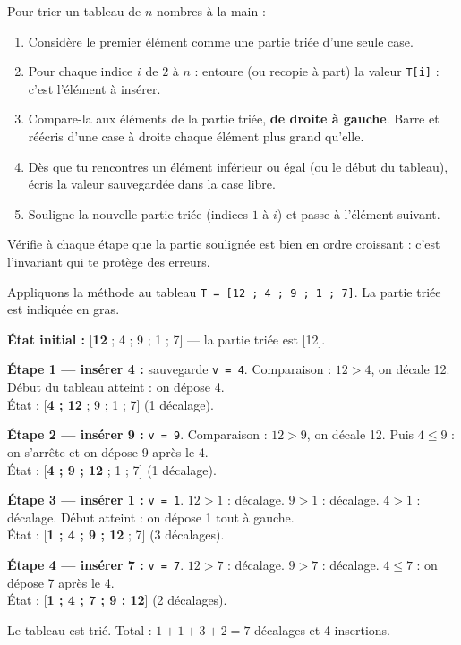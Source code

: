 \documentclass[11pt]{article}
\begin{document}
\begin{methode}
Pour trier un tableau de $n$ nombres à la main :
\begin{enumerate}
\item Considère le premier élément comme une partie triée d'une seule case.
\item Pour chaque indice $i$ de $2$ à $n$ : entoure (ou recopie à part) la valeur \texttt{T[i]} : c'est l'élément à insérer.
\item Compare-la aux éléments de la partie triée, \textbf{de droite à gauche}. Barre et réécris d'une case à droite chaque élément plus grand qu'elle.
\item Dès que tu rencontres un élément inférieur ou égal (ou le début du tableau), écris la valeur sauvegardée dans la case libre.
\item Souligne la nouvelle partie triée (indices $1$ à $i$) et passe à l'élément suivant.
\end{enumerate}
Vérifie à chaque étape que la partie soulignée est bien en ordre croissant : c'est l'invariant qui te protège des erreurs.
\end{methode}

\begin{exemplebox}
Appliquons la méthode au tableau \texttt{T = [12 ; 4 ; 9 ; 1 ; 7]}. La partie triée est indiquée en gras.

\textbf{État initial :} [\textbf{12} ; 4 ; 9 ; 1 ; 7] — la partie triée est [12].

\textbf{Étape 1 — insérer 4 :} sauvegarde \texttt{v = 4}. Comparaison : $12 > 4$, on décale 12. Début du tableau atteint : on dépose 4. \\
État : [\textbf{4 ; 12} ; 9 ; 1 ; 7] (1 décalage).

\textbf{Étape 2 — insérer 9 :} \texttt{v = 9}. Comparaison : $12 > 9$, on décale 12. Puis $4 \leq 9$ : on s'arrête et on dépose 9 après le 4. \\
État : [\textbf{4 ; 9 ; 12} ; 1 ; 7] (1 décalage).

\textbf{Étape 3 — insérer 1 :} \texttt{v = 1}. $12 > 1$ : décalage. $9 > 1$ : décalage. $4 > 1$ : décalage. Début atteint : on dépose 1 tout à gauche. \\
État : [\textbf{1 ; 4 ; 9 ; 12} ; 7] (3 décalages).

\textbf{Étape 4 — insérer 7 :} \texttt{v = 7}. $12 > 7$ : décalage. $9 > 7$ : décalage. $4 \leq 7$ : on dépose 7 après le 4. \\
État : [\textbf{1 ; 4 ; 7 ; 9 ; 12}] (2 décalages).

Le tableau est trié. Total : $1+1+3+2 = 7$ décalages et 4 insertions.
\end{exemplebox}
\end{document}
